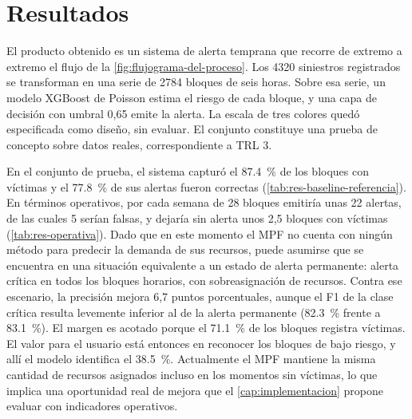 \chapter{Resultados}\label{cap:resultados}

El producto obtenido es un sistema de alerta temprana que recorre de extremo a extremo el flujo de la \cref{fig:flujograma-del-proceso}. Los 4320 siniestros registrados se transforman en una serie de 2784 bloques de seis horas. Sobre esa serie, un modelo XGBoost de Poisson estima el riesgo de cada bloque, y una capa de decisión con umbral 0,65 emite la alerta. La escala de tres colores quedó especificada como diseño, sin evaluar. El conjunto constituye una prueba de concepto sobre datos reales, correspondiente a TRL 3.

En el conjunto de prueba, el sistema capturó el \qty{87.4}{\percent} de los bloques con víctimas y el \qty{77.8}{\percent} de sus alertas fueron correctas (\cref{tab:res-baseline-referencia}). En términos operativos, por cada semana de 28 bloques emitiría unas 22 alertas, de las cuales 5 serían falsas, y dejaría sin alerta unos 2,5 bloques con víctimas (\cref{tab:res-operativa}). Dado que en este momento el MPF no cuenta con ningún método para predecir la demanda de sus recursos, puede asumirse que se encuentra en una situación equivalente a un estado de alerta permanente: alerta crítica en todos los bloques horarios, con sobreasignación de recursos. Contra ese escenario, la precisión mejora 6,7 puntos porcentuales, aunque el F1 de la clase crítica resulta levemente inferior al de la alerta permanente (\qty{82.3}{\percent} frente a \qty{83.1}{\percent}). El margen es acotado porque el \qty{71.1}{\percent} de los bloques registra víctimas. El valor para el usuario está entonces en reconocer los bloques de bajo riesgo, y allí el modelo identifica el \qty{38.5}{\percent}. Actualmente el MPF mantiene la misma cantidad de recursos asignados incluso en los momentos sin víctimas, lo que implica una oportunidad real de mejora que el \cref{cap:implementacion} propone evaluar con indicadores operativos.

